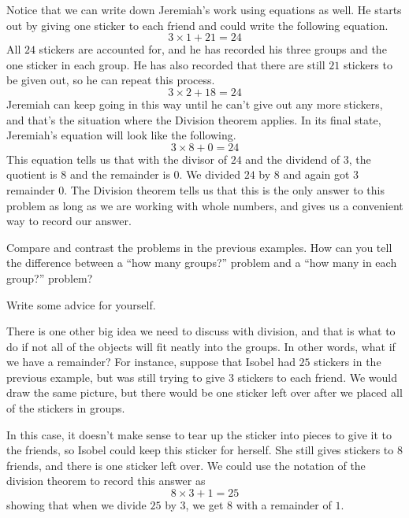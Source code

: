 \documentclass{ximera}
\begin{document}
Notice that we can write down Jeremiah's work using equations as well. He starts out by giving one sticker to each friend and could write the following equation.
\[
3 \times 1 + 21 = 24
\]
All $24$ stickers are accounted for, and he has recorded his three groups and the one sticker in each group. He has also recorded that there are still $21$ stickers to be given out, so he can repeat this process.
\[
3 \times 2 + 18  = 24
\]
Jeremiah can keep going in this way until he can't give out any more stickers, and that's the situation where the Division theorem applies. In its final state, Jeremiah's equation will look like the following.
\[
3 \times 8 + 0 = 24
\]
This equation tells us that with the divisor of  $24$ and the dividend of $3$, the quotient is $8$ and the remainder is $0$. We divided $24$ by $8$ and again got $3$ remainder $0$. The Division theorem tells us that this is the only answer to this problem as long as we are working with whole numbers, and gives us a convenient way to record our answer.

\begin{question}
Compare and contrast the problems in the previous examples. How can you tell the difference between a ``how many groups?'' problem and a ``how many in each group?'' problem?
\begin{freeResponse}
Write some advice for yourself.
\end{freeResponse}
\end{question}


There is one other big idea we need to discuss with division, and that is what to do if not all of the objects will fit neatly into the groups. In other words, what if we have a remainder? For instance, suppose that Isobel had $25$ stickers in the previous example, but was still trying to give $3$ stickers to each friend. We would draw the same picture, but there would be one sticker left over after we placed all of the stickers in groups. 

\begin{image}
\end{image}
In this case, it doesn't make sense to tear up the sticker into pieces to give it to the friends, so Isobel could keep this sticker for herself. She still gives stickers to $8$ friends, and there is one sticker left over. We could use the notation of the division theorem to record this answer as 
\[
8 \times 3 + 1 = 25
\]
showing that when we divide $25$ by $3$, we get $8$ with a remainder of $1$.
\end{document}
